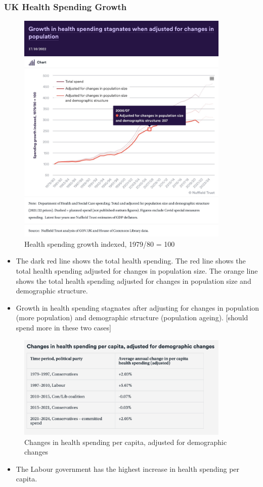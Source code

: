         \subsubsection{UK Health Spending Growth} 
            \begin{figure}[H]
                \centering
                \includegraphics[width=4in]{images/ch3/8.png}
                \caption{Health spending growth indexed, 1979/80 = 100}
            \end{figure} 
            \begin{itemize}           
                \item The dark red line shows the total health spending. The red line shows the total health spending adjusted for changes in population size. The orange line shows the total health spending adjusted for changes in population size and demographic structure.
                \item Growth in health spending stagnates after adjusting for changes in population (more population) and demographic structure (population ageing). [should spend more in these two cases]
            \end{itemize}       
            \begin{figure}[H]
                \centering
                \includegraphics[width=4in]{images/ch3/9.png}
                \caption{Changes in health spending per capita, adjusted for demographic changes}
            \end{figure} 
             \begin{itemize}
                \item The Labour government has the highest increase in health spending per capita.
            \end{itemize}

